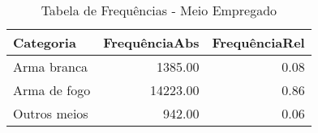 \begin{table}[ht]
\centering
\begin{tabular}{lrr}
  \hline
Categoria & FrequênciaAbs & FrequênciaRel \\ 
  \hline
Arma branca & 1385.00 & 0.08 \\ 
  Arma de fogo & 14223.00 & 0.86 \\ 
  Outros meios & 942.00 & 0.06 \\ 
   \hline
\end{tabular}
\caption{Tabela de Frequências - Meio Empregado} 
\end{table}
